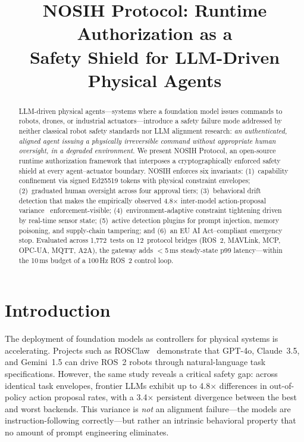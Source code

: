\documentclass[conference]{IEEEtran}
\begin{document}
\title{NOSIH Protocol: Runtime Authorization as a\\Safety Shield for LLM-Driven Physical Agents}

\author{
}

\maketitle

\begin{abstract}
LLM-driven physical agents---systems where a foundation model issues commands to
robots, drones, or industrial actuators---introduce a safety failure mode
addressed by neither classical robot safety standards nor LLM alignment research:
\emph{an authenticated, aligned agent issuing a physically irreversible command
without appropriate human oversight, in a degraded environment.}
We present NOSIH Protocol, an open-source runtime authorization framework that
interposes a cryptographically enforced safety shield at every agent--actuator
boundary.
NOSIH enforces six invariants: (1)~capability confinement via signed Ed25519
tokens with physical constraint envelopes; (2)~graduated human oversight across
four approval tiers; (3)~behavioral drift detection that makes the empirically
observed 4.8$\times$ inter-model action-proposal variance~\cite{rosclaw}
enforcement-visible; (4)~environment-adaptive constraint tightening driven by
real-time sensor state; (5)~active detection plugins for prompt injection,
memory poisoning, and supply-chain tampering; and (6)~an EU AI Act--compliant
emergency stop.
Evaluated across 1,772~tests on 12~protocol bridges (ROS~2, MAVLink, MCP, OPC-UA,
MQTT, A2A), the gateway adds $<$5\,ms steady-state p99 latency---within the
10\,ms budget of a 100\,Hz ROS~2 control loop.
\end{abstract}

\section{Introduction}
\label{sec:intro}

The deployment of foundation models as controllers for physical systems is
accelerating.
Projects such as ROSClaw~\cite{rosclaw} demonstrate that GPT-4o, Claude~3.5, and
Gemini~1.5 can drive ROS~2 robots through natural-language task specifications.
However, the same study reveals a critical safety gap: across identical task
envelopes, frontier LLMs exhibit up to 4.8$\times$ differences in out-of-policy
action proposal rates, with a 3.4$\times$ persistent divergence between the best
and worst backends.
This variance is \emph{not} an alignment failure---the models are instruction-following
correctly---but rather an intrinsic behavioral property that no amount of prompt
engineering eliminates.
\end{document}
